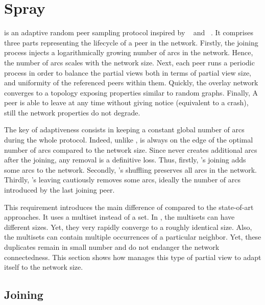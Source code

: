 
\section{Spray}
\label{sec:proposal}

\SPRAY is an adaptive random peer sampling protocol inspired by
\SCAMP~\cite{ganesh2003peer} and \CYCLON~\cite{voulgaris2005cyclon}. It
comprises three parts representing the lifecycle of a peer in the network.
Firstly, the joining process injects a logarithmically growing number of arcs
in the network. Hence, the number of arcs scales with the network size.  Next,
each peer runs a periodic process in order to balance the partial views both in
terms of partial view size, and uniformity of the referenced peers within
them. Quickly, the overlay network converges to a topology exposing properties
similar to random graphs. Finally, A peer is able to leave at any time without
giving notice (equivalent to a crash), still the network properties do not
degrade.

The key of adaptiveness consists in keeping a constant global number of arcs
during the whole protocol. Indeed, unlike \CYCLON, \SPRAY is always on the edge
of the optimal number of arcs compared to the network size. Since \SPRAY never
creates additional arcs after the joining, any removal is a definitive
loss. Thus, firstly, \SPRAY's joining adds some arcs to the network. Secondly,
\SPRAY's shuffling preserves all arcs in the network. Thirdly, \SPRAY's leaving
cautiously removes some arcs, ideally the number of arcs introduced by the last
joining peer.

This requirement introduces the main difference of \SPRAY compared to the
state-of-art approaches. It uses a multiset instead of a set. In \SPRAY, the
multisets can have different sizes. Yet, they very rapidly converge to a
roughly identical size. Also, the multisets can contain multiple occurrences of
a particular neighbor. Yet, these duplicates remain in small number and do not
endanger the network connectedness. This section shows how \SPRAY manages this
type of partial view to adapt itself to the network size.

\subsection{Joining}


